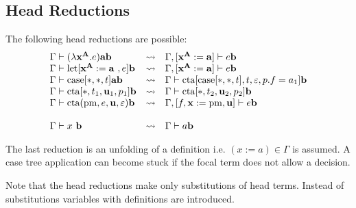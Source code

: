 \subsection{Head Reductions}

The following head reductions are possible:
$$
\begin{array}{llll}
        \Gamma \vdash (\lambda \vec x^{\vec A}. e) \vec a \vec b
        &\reduce&
        \Gamma, [\vec x^{\vec A} := \vec a] \vdash e \vec b
        \\
        \Gamma \vdash \llet[\vec x^{\vec A} := \vec a , e] \vec b
        &\reduce&
        \Gamma, [\vec x^{\vec A} := \vec a] \vdash e \vec b
        \\
        \Gamma \vdash \case[*, *, t] \vec a \vec b
        &\reduce&
        \Gamma \vdash \cta[\case[*,*,t], t, \empty, p.f = a_1] \vec b
        \\
        \Gamma \vdash \cta[*, t_1, \vec u_1, p_1] \vec b
        &\reduce&
        \Gamma \vdash \cta[*, t_2, \vec u_2, p_2] \vec b
        \\
        \Gamma
        \vdash
        \cta(\text{pm}, e, \vec u, \empty) \vec b
        &\reduce&
        \Gamma, [f,\vec x := \text{pm}, \vec u]
        \vdash
        e \vec b
        \\
        \\
        \Gamma \vdash x \vec b
        &\reduce&
        \Gamma \vdash a \vec b
\end{array}
$$

The last reduction is an unfolding of a definition i.e. $(x:=a) \in \Gamma$ is
assumed. A case tree application can become stuck if the focal term does not
allow a decision.

Note that the head reductions make only substitutions of head terms. Instead of
substitutions variables with definitions are introduced.
